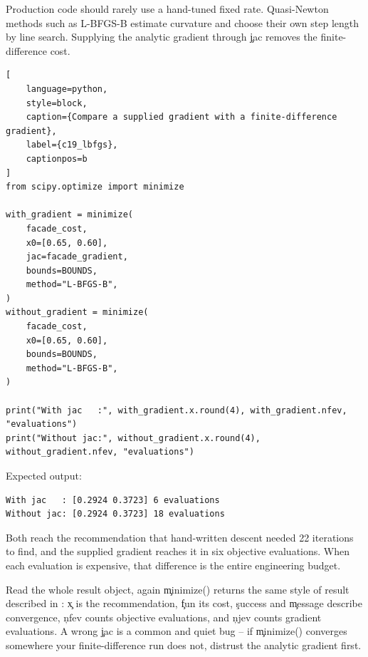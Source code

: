 
Production code should rarely use a hand-tuned fixed rate. Quasi-Newton methods
such as L-BFGS-B estimate curvature and choose their own step length by line
search. Supplying the analytic gradient through \c{jac} removes the
finite-difference cost.

\begin{lstlisting}[
    language=python,
    style=block,
    caption={Compare a supplied gradient with a finite-difference gradient},
    label={c19_lbfgs},
    captionpos=b
]
from scipy.optimize import minimize

with_gradient = minimize(
    facade_cost,
    x0=[0.65, 0.60],
    jac=facade_gradient,
    bounds=BOUNDS,
    method="L-BFGS-B",
)
without_gradient = minimize(
    facade_cost,
    x0=[0.65, 0.60],
    bounds=BOUNDS,
    method="L-BFGS-B",
)

print("With jac   :", with_gradient.x.round(4), with_gradient.nfev, "evaluations")
print("Without jac:", without_gradient.x.round(4), without_gradient.nfev, "evaluations")
\end{lstlisting}

Expected output:

\begin{lstlisting}[language=text, style=block, caption={The same optimum at different evaluation costs}, label={c19_lbfgs_output}, captionpos=b]
With jac   : [0.2924 0.3723] 6 evaluations
Without jac: [0.2924 0.3723] 18 evaluations
\end{lstlisting}

Both reach the recommendation that hand-written descent needed 22 iterations to
find, and the supplied gradient reaches it in six objective evaluations. When
each evaluation is expensive, that difference is the entire engineering budget.

\begin{SyntaxBox}{Read the whole result object, again}
\c{minimize()} returns the same style of result described in
: \c{x} is the recommendation, \c{fun} its cost,
\c{success} and \c{message} describe convergence, \c{nfev} counts objective
evaluations, and \c{njev} counts gradient evaluations. A wrong \c{jac} is a
common and quiet bug -- if \c{minimize()} converges somewhere your
finite-difference run does not, distrust the analytic gradient first.
\end{SyntaxBox}


